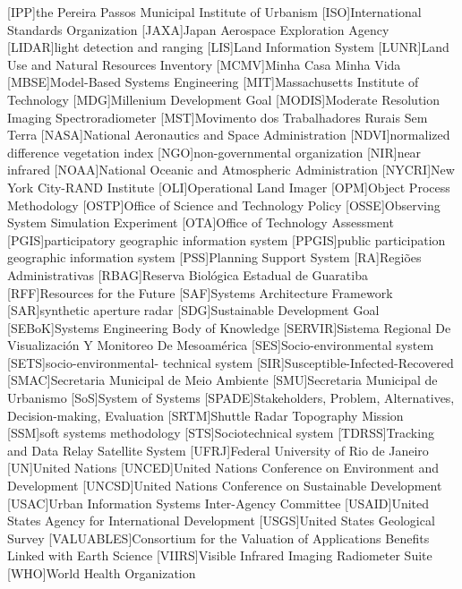 \begin{acronym}[HyperLEAVES]
[IPP]{the Pereira Passos Municipal Institute of Urbanism}
[ISO]{International Standards Organization}
[JAXA]{Japan Aerospace Exploration Agency}
[LIDAR]{light detection and ranging}
[LIS]{Land Information System}
[LUNR]{Land Use and Natural Resources Inventory}
[MCMV]{Minha Casa Minha Vida}
[MBSE]{Model-Based Systems Engineering}
[MIT]{Massachusetts Institute of Technology}
[MDG]{Millenium Development Goal}
[MODIS]{Moderate Resolution Imaging Spectroradiometer}
[MST]{Movimento dos Trabalhadores Rurais Sem Terra}
[NASA]{National Aeronautics and Space Administration}
[NDVI]{normalized difference vegetation index}
[NGO]{non-governmental organization}
[NIR]{near infrared}
[NOAA]{National Oceanic and Atmospheric Administration}
[NYCRI]{New York City-RAND Institute}
[OLI]{Operational Land Imager}
[OPM]{Object Process Methodology}
[OSTP]{Office of Science and Technology Policy}
[OSSE]{Observing System Simulation Experiment}
[OTA]{Office of Technology Assessment}
[PGIS]{participatory geographic information system}
[PPGIS]{public participation geographic information system}
[PSS]{Planning Support System}
[RA]{Regiões Administrativas}
[RBAG]{Reserva Biológica Estadual de Guaratiba}
[RFF]{Resources for the Future}
[SAF]{Systems Architecture Framework}
[SAR]{synthetic aperture radar}
[SDG]{Sustainable Development Goal}
[SEBoK]{Systems Engineering Body of Knowledge}
[SERVIR]{Sistema Regional De Visualizaci\'{o}n Y Monitoreo De Mesoam\'{e}rica}
[SES]{Socio-environmental system}
[SETS]{socio-environmental-
technical system}
[SIR]{Susceptible-Infected-Recovered}
[SMAC]{Secretaria Municipal de Meio Ambiente}
[SMU]{Secretaria Municipal de Urbanismo}
[SoS]{System of Systems}
[SPADE]{Stakeholders, Problem, Alternatives, Decision-making, Evaluation}
[SRTM]{Shuttle Radar Topography Mission}
[SSM]{soft systems methodology}
[STS]{Sociotechnical system}
[TDRSS]{Tracking and Data Relay Satellite System}
[UFRJ]{Federal University of Rio de Janeiro}
[UN]{United Nations}
[UNCED]{United Nations Conference on Environment and Development}
[UNCSD]{United Nations Conference on Sustainable Development}
[USAC]{Urban Information Systems Inter-Agency Committee}
[USAID]{United States Agency for International Development}
[USGS]{United States Geological Survey}
[VALUABLES]{Consortium for the Valuation of Applications Benefits Linked with Earth Science}
[VIIRS]{Visible Infrared Imaging Radiometer Suite}
[WHO]{World Health Organization}






\end{acronym}
